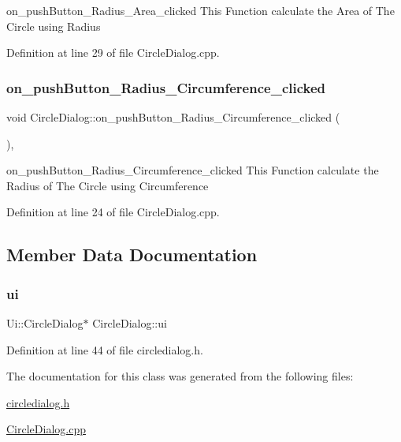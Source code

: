 on\+\_\+push\+Button\+\_\+\+Radius\+\_\+\+Area\+\_\+clicked This Function calculate the Area of The Circle using Radius 



Definition at line 29 of file Circle\+Dialog.\+cpp.

\mbox{\label{class_circle_dialog_ab63c3e021ff34ce5b48c98ec57f40a8e}} 
\subsubsection{\texorpdfstring{on\+\_\+push\+Button\+\_\+\+Radius\+\_\+\+Circumference\+\_\+clicked}{on\_pushButton\_Radius\_Circumference\_clicked}}
{\footnotesize\ttfamily void Circle\+Dialog\+::on\+\_\+push\+Button\+\_\+\+Radius\+\_\+\+Circumference\+\_\+clicked (\begin{DoxyParamCaption}{ }\end{DoxyParamCaption})\hspace{0.3cm}{\ttfamily [private]}, {\ttfamily [slot]}}



on\+\_\+push\+Button\+\_\+\+Radius\+\_\+\+Circumference\+\_\+clicked This Function calculate the Radius of The Circle using Circumference 



Definition at line 24 of file Circle\+Dialog.\+cpp.



\subsection{Member Data Documentation}
\mbox{\label{class_circle_dialog_a44a0e6657fdc9ee80e99a6179e82564a}} 
\subsubsection{\texorpdfstring{ui}{ui}}
{\footnotesize\ttfamily Ui\+::\+Circle\+Dialog$\ast$ Circle\+Dialog\+::ui\hspace{0.3cm}{\ttfamily [private]}}



Definition at line 44 of file circledialog.\+h.



The documentation for this class was generated from the following files\+:\begin{DoxyCompactItemize}
\item 
\mbox{\hyperlink{circledialog_8h}{circledialog.\+h}}\item 
\mbox{\hyperlink{_circle_dialog_8cpp}{Circle\+Dialog.\+cpp}}\end{DoxyCompactItemize}
